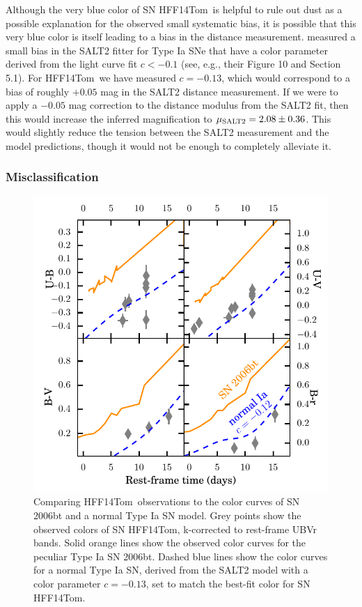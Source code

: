 \documentclass[iop]{emulateapj}
\def\tomas{HFF14Tom}
\begin{document}
Although the very blue color of SN \tomas\ is helpful to rule out dust
as a possible explanation for the observed small systematic bias, it
is possible that this very blue color is itself leading to a bias in
the distance measurement.  \citet{Scolnic:2014b} measured a small bias
in the SALT2 fitter for Type Ia SNe that have a color parameter
derived from the light curve fit $c<-0.1$ (see, e.g., their Figure 10
and Section 5.1). For \tomas\ we have measured $c=-0.13$, which would
correspond to a bias of roughly $+0.05$ mag in the SALT2 distance
measurement.  If we were to apply a $-0.05$ mag correction to the
distance modulus from the SALT2 fit, then this would increase the
inferred magnification to $\mu_{\rm SALT2}=2.08\pm0.36$.  This would
slightly reduce the tension between the SALT2 measurement and the model predictions, though it would not be enough to completely alleviate it.

\subsubsection{Misclassification}
\label{sec:Misclassification}

\begin{figure}
\begin{center}
\includegraphics[width=\columnwidth]{snTomas_sn06bt_colorcurves}
\caption{ 
Comparing \tomas\ observations to the color curves of SN 2006bt and a
normal Type Ia SN model. Grey points show the observed colors of
SN \tomas, k-corrected to rest-frame UBVr bands. Solid orange lines
show the observed color curves for the peculiar Type Ia SN
2006bt. Dashed blue lines show the color curves for a normal Type Ia
SN, derived from the SALT2 model with a color parameter $c=-0.13$, set
to match the best-fit color for SN \tomas.
\label{fig:colorcomparison} }
\end{center}
\end{figure}
\end{document}
